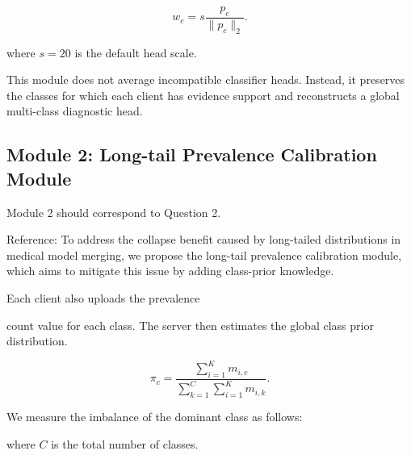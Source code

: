 \documentclass[letterpaper]{article}
\begin{document}
\begin{equation}
w_c=s\frac{p_c}{\|p_c\|_2}.
\end{equation}

where $s=20$ is the default head scale.


This module does not average incompatible classifier heads. Instead, it preserves the classes for which each client has evidence support and reconstructs a global multi-class diagnostic head.


\subsection{Module 2: Long-tail Prevalence Calibration Module}

Module 2 should correspond to Question 2.


Reference: To address the collapse benefit caused by long-tailed distributions in medical model merging, we propose the long-tail prevalence calibration module, which aims to mitigate this issue by adding class-prior knowledge.


Each client also uploads the prevalence


count value for each class. The server then estimates the global class prior distribution.


\begin{equation}
\pi_c=\frac{\sum_{i=1}^{K}m_{i,c}}{\sum_{k=1}^{C}\sum_{i=1}^{K}m_{i,k}}.
\end{equation}

We measure the imbalance of the dominant class as follows:


where $C$ is the total number of classes.
\end{document}
